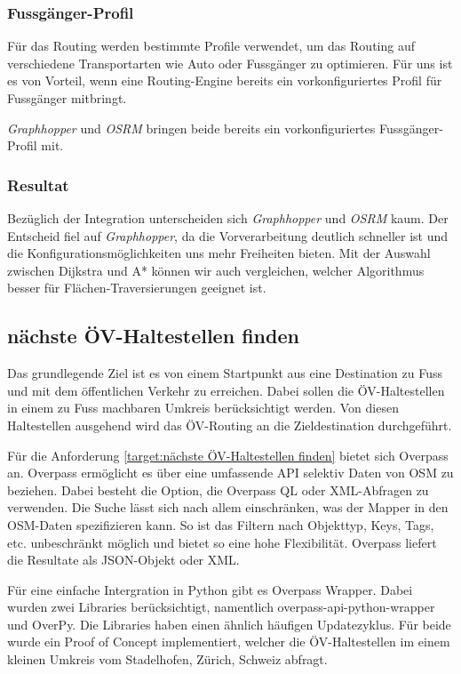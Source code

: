 \subsubsection{Fussgänger-Profil}
\label{analyse:Fussgänger-Profil}
Für das Routing werden bestimmte Profile verwendet, um das Routing auf verschiedene Transportarten wie Auto oder Fussgänger zu optimieren. Für uns ist es von Vorteil, wenn eine Routing-Engine bereits ein vorkonfiguriertes Profil für Fussgänger mitbringt.

\emph{Graphhopper} und \emph{OSRM} bringen beide bereits ein vorkonfiguriertes Fussgänger-Profil mit.

\subsubsection{Resultat}
\label{analyse:Resulat}
Bezüglich der Integration unterscheiden sich \emph{Graphhopper} und \emph{OSRM} kaum. Der Entscheid fiel auf \emph{Graphhopper}, da die Vorverarbeitung deutlich schneller ist und die Konfigurationsmöglichkeiten uns mehr Freiheiten bieten. Mit der Auswahl zwischen Dijkstra und A* können wir auch vergleichen, welcher Algorithmus besser für Flächen-Traversierungen geeignet ist.


\subsection{nächste ÖV-Haltestellen finden}
\label{analyse:nächste ÖV-Haltestellen finden}

Das grundlegende Ziel ist es von einem Startpunkt aus eine Destination zu Fuss und mit dem öffentlichen Verkehr zu erreichen. Dabei sollen die ÖV-Haltestellen in einem zu Fuss machbaren Umkreis berücksichtigt werden. Von diesen Haltestellen ausgehend wird das ÖV-Routing an die Zieldestination durchgeführt.

Für die Anforderung \ref{target:nächste ÖV-Haltestellen finden} bietet sich Overpass an. Overpass ermöglicht es über eine umfassende \ac{API} selektiv Daten von \ac{OSM} zu beziehen. Dabei besteht die Option, die Overpass \ac{QL} oder XML-Abfragen zu verwenden. Die Suche lässt sich nach allem einschränken, was der Mapper in den \ac{OSM}-Daten spezifizieren kann. So ist das Filtern nach Objekttyp, Keys, Tags, etc. unbeschränkt möglich und bietet so eine hohe Flexibilität. Overpass liefert die Resultate als JSON-Objekt oder XML. 

Für eine einfache Intergration in Python gibt es Overpass Wrapper. Dabei wurden zwei Libraries berücksichtigt, namentlich overpass-api-python-wrapper und OverPy. Die Libraries haben einen ähnlich häufigen Updatezyklus. Für beide wurde ein Proof of Concept implementiert, welcher die ÖV-Haltestellen im einem kleinen Umkreis vom Stadelhofen, Zürich, Schweiz abfragt.

